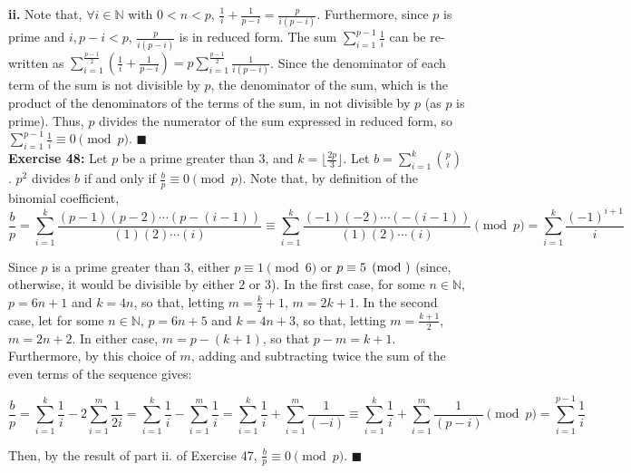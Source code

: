\documentclass{article}%
\begin{document}
\textbf{ii.} Note that, $\forall i \in \mathbb{N}$ with $0 < n < p$,
$\frac{1}{i} + \frac{1}{p - i} = \frac{p}{i(p - i)}$. Furthermore, since $p$
is prime and $i, p - i < p$, $\frac{p}{i(p - i)}$ is in reduced form. The
sum $\sum_{i = 1}^{p - 1} \frac{1}{i}$ can be re-written as
$\sum_{i = 1}^{\frac{p - 1}{2}}\left( \frac{1}{i} + \frac{1}{p - i}\right)
 = p\sum_{i = 1}^{\frac{p - 1}{2}}\frac{1}{i(p - i)}$. Since the denominator
of each term of the sum is not divisible by $p$, the denominator of the sum,
which is the product of the denominators of the terms of the sum, in not
divisible by $p$ (as $p$ is prime). Thus, $p$ divides the numerator of the
sum expressed in reduced form, so
$\sum_{i = 1}^{p - 1} \frac{1}{i} \equiv 0 \pmod p$. \qquad $\blacksquare$ \\


\textbf{Exercise 48:} Let $p$ be a prime greater than $3$, and
$k = \lfloor \frac{2p}{3} \rfloor$. Let $b = \sum_{i = 1}^k {p \choose i}$.
$p^2$ divides $b$ if and only if $\frac{b}{p} \equiv 0 \pmod p$. Note that, by
definition of the binomial coefficient,
\[\frac{b}{p} = \sum_{i = 1}^k
    \frac{(p - 1)(p - 2) \cdots (p - (i - 1))}{(1)(2) \cdots (i)}
 \equiv \sum_{i = 1}^k \frac{(-1)(-2) \cdots (-(i - 1))}{(1)(2) \cdots (i)}
    \pmod p
 = \sum_{i = 1}^k \frac{(-1)^{i + 1}}{i}\]

Since $p$ is a prime greater than $3$, either $p \equiv 1 \pmod 6$ or
$p \equiv 5 \pmod$ (since, otherwise, it would be divisible by either $2$ or
$3$). In the first case, for some $n \in \mathbb{N}$, $p = 6n + 1$ and
$k = 4n$, so that, letting $m = \frac{k}{2} + 1$, $m = 2k + 1$. In the
second case, let for some $n \in \mathbb{N}$, $p = 6n + 5$ and
$k = 4n + 3$, so that, letting $m = \frac{k + 1}{2}$, $m = 2n + 2$.
In either case, $m = p - (k + 1)$, so that $p - m = k + 1$. Furthermore, by
this choice of $m$, adding and subtracting twice the sum of the even terms of
the sequence gives:

\[\frac{b}{p} = \sum_{i = 1}^k \frac{1}{i} - 2\sum_{i = 1}^m \frac{1}{2i}
 = \sum_{i = 1}^k \frac{1}{i} - \sum_{i = 1}^m \frac{1}{i}
 = \sum_{i = 1}^k \frac{1}{i} + \sum_{i = 1}^m \frac{1}{(-i)}
 \equiv \sum_{i = 1}^k \frac{1}{i} + \sum_{i = 1}^m \frac{1}{(p-i)} \pmod p
 = \sum_{i = 1}^{p - 1} \frac{1}{i}
\]

Then, by the result of part ii. of Exercise 47, $\frac{b}{p} \equiv 0 \pmod p$.
\qquad $\blacksquare$ \\
\end{document}
